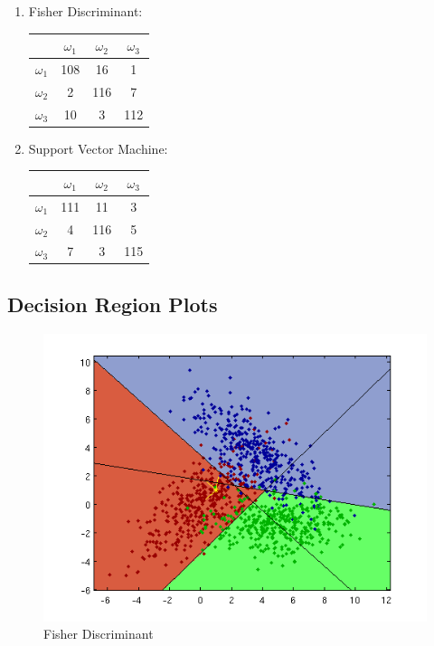 \documentclass[a4paper]{article}
\begin{document}
\begin{multicols}{2}
\begin{enumerate}
\item Fisher Discriminant:

\begin{tabular}{ | l | c | c | c | }
\hline
& $\omega_1$ & $\omega_2$ & $\omega_3$ \\
\hline
  $\omega_1$ & 108 & 16 & 1 \\
\hline
  $\omega_2$ & 2 & 116 & 7 \\
\hline
  $\omega_3$ & 10 & 3 & 112 \\
\hline
\end{tabular}

\item Support Vector Machine:

\begin{tabular}{ | l | c | c | c | }
\hline
& $\omega_1$ & $\omega_2$ & $\omega_3$ \\
\hline
  $\omega_1$ & 111 & 11 & 3 \\
\hline
  $\omega_2$ & 4 & 116 & 5 \\
\hline
  $\omega_3$ & 7 & 3 & 115 \\
\hline
\end{tabular}

\end{enumerate}
\end{multicols}

\subsection{Decision Region Plots}

\begin{figure}[htbp!]
\center
\includegraphics[clip, trim=40px 15px 30px 10px]{nls_fisher.png}
\caption{Fisher Discriminant}
\end{figure}
\end{document}
